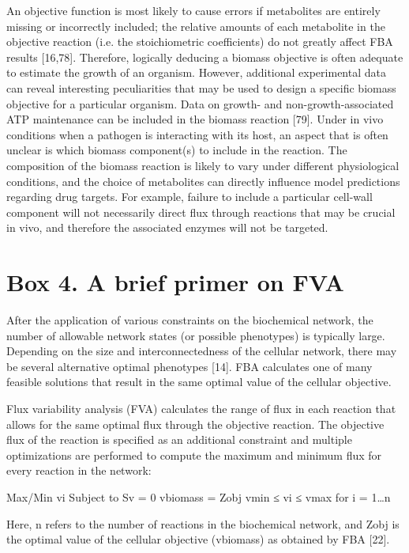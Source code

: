 An objective function is most likely to cause 
errors if metabolites are entirely missing or 
incorrectly included; the relative amounts of each 
metabolite in the objective reaction (i.e. the 
stoichiometric coefficients) do not greatly affect 
FBA results [16,78]. Therefore, logically 
deducing a biomass objective is often adequate 
to estimate the growth of an organism. However, 
additional experimental data can reveal interesting 
peculiarities that may be used to design a specific 
biomass objective for a particular organism. 
Data on growth- and non-growth-associated ATP 
maintenance can be included in the biomass 
reaction [79]. Under in vivo conditions when a 
pathogen is interacting with its host, an aspect 
that is often unclear is which biomass component(s) 
to include in the reaction. The composition of the 
biomass reaction is likely to vary under different 
physiological conditions, and the choice of metabolites 
can directly influence model predictions regarding 
drug targets. For example, failure to include a 
particular cell-wall component will not necessarily 
direct flux through reactions that may be crucial in 
vivo, and therefore the associated enzymes will not 
be targeted.

\section{Box 4. A brief primer on FVA}
After the application of various constraints on the 
biochemical network, the number of allowable network 
states (or possible phenotypes) is typically large. 
Depending on the size and interconnectedness of the 
cellular network, there may be several alternative 
optimal phenotypes [14]. FBA calculates one of many 
feasible solutions that result in the same optimal 
value of the cellular objective.

Flux variability analysis (FVA) calculates the range of 
flux in each reaction that allows for the same optimal 
flux through the objective reaction. The objective 
flux of the reaction is specified as an additional 
constraint and multiple optimizations are performed 
to compute the maximum and minimum flux for every reaction in the network:

Max/Min vi
Subject to	Sv = 0
		vbiomass = Zobj
		vmin ≤ vi ≤ vmax	for i = 1…n

Here, n refers to the number of reactions in the 
biochemical network, and Zobj is the optimal value 
of the cellular objective (vbiomass) as obtained by FBA [22].


\singlespacing
\printbibliography



